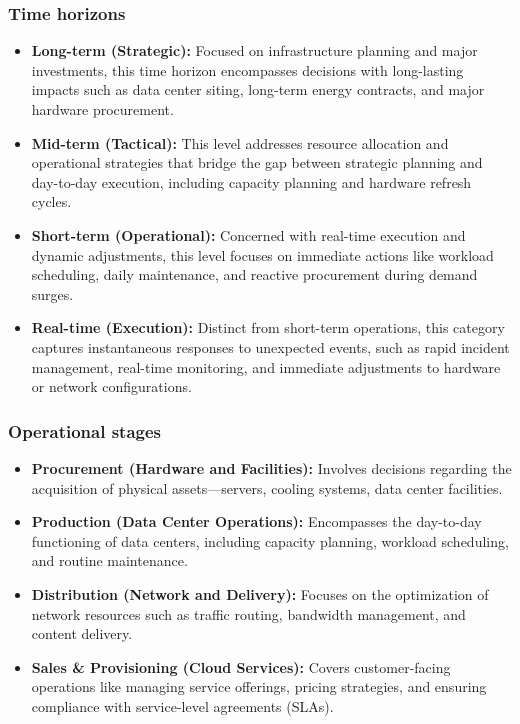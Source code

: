 \documentclass[pdflatex,sn-mathphys-num]{sn-jnl}
\theoremstyle{thmstyleone}
\theoremstyle{thmstyletwo}
\theoremstyle{thmstylethree}
\begin{document}
\subsubsection{Time horizons}
\begin{itemize}
    \item \textbf{Long-term (Strategic):} Focused on infrastructure planning and major investments, this time horizon encompasses decisions with long-lasting impacts such as data center siting, long-term energy contracts, and major hardware procurement.
    \item \textbf{Mid-term (Tactical):} This level addresses resource allocation and operational strategies that bridge the gap between strategic planning and day-to-day execution, including capacity planning and hardware refresh cycles.
    \item \textbf{Short-term (Operational):} Concerned with real-time execution and dynamic adjustments, this level focuses on immediate actions like workload scheduling, daily maintenance, and reactive procurement during demand surges.
    \item \textbf{Real-time (Execution):} Distinct from short-term operations, this category captures instantaneous responses to unexpected events, such as rapid incident management, real-time monitoring, and immediate adjustments to hardware or network configurations.
\end{itemize}

\subsubsection{Operational stages}
\begin{itemize}
    \item \textbf{Procurement (Hardware and Facilities):} Involves decisions regarding the acquisition of physical assets—servers, cooling systems, data center facilities.
    \item \textbf{Production (Data Center Operations):} Encompasses the day-to-day functioning of data centers, including capacity planning, workload scheduling, and routine maintenance.
    \item \textbf{Distribution (Network and Delivery):} Focuses on the optimization of network resources such as traffic routing, bandwidth management, and content delivery.
    \item \textbf{Sales \& Provisioning (Cloud Services):} Covers customer-facing operations like managing service offerings, pricing strategies, and ensuring compliance with service-level agreements (SLAs).
\end{itemize}
\end{document}
